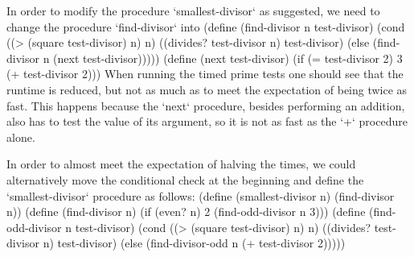 In order to modify the procedure `smallest-divisor` as suggested, we need to change the procedure `find-divisor` into
\begtt\scm
(define (find-divisor n test-divisor)
  (cond ((> (square test-divisor) n) n)
        ((divides? test-divisor n) test-divisor)
        (else (find-divisor n (next test-divisor)))))
(define (next test-divisor)
  (if (= test-divisor 2)
      3
      (+ test-divisor 2)))
\endtt
When running the timed prime tests one should see that the runtime is reduced, but not as much as to meet the expectation of being twice as fast.  This happens because the `next` procedure, besides performing an addition, also has to test the value of its argument, so it is not as fast as the `+` procedure alone. 

In order to almost meet the expectation of halving the times, we could alternatively move the conditional check at the beginning and define the `smallest-divisor` procedure as follows:
\begtt\scm
(define (smallest-divisor n) (find-divisor n))
(define (find-divisor n)
  (if (even? n) 2 (find-odd-divisor n 3)))
(define (find-odd-divisor n test-divisor)
  (cond ((> (square test-divisor) n) n)
        ((divides? test-divisor n) test-divisor)
        (else (find-divisor-odd n (+ test-divisor 2)))))
\endtt
